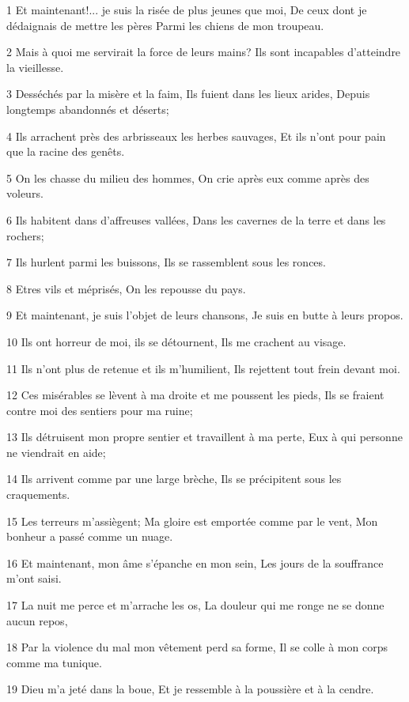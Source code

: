 \par 1 Et maintenant!... je suis la risée de plus jeunes que moi, De ceux dont je dédaignais de mettre les pères Parmi les chiens de mon troupeau.
\par 2 Mais à quoi me servirait la force de leurs mains? Ils sont incapables d'atteindre la vieillesse.
\par 3 Desséchés par la misère et la faim, Ils fuient dans les lieux arides, Depuis longtemps abandonnés et déserts;
\par 4 Ils arrachent près des arbrisseaux les herbes sauvages, Et ils n'ont pour pain que la racine des genêts.
\par 5 On les chasse du milieu des hommes, On crie après eux comme après des voleurs.
\par 6 Ils habitent dans d'affreuses vallées, Dans les cavernes de la terre et dans les rochers;
\par 7 Ils hurlent parmi les buissons, Ils se rassemblent sous les ronces.
\par 8 Etres vils et méprisés, On les repousse du pays.
\par 9 Et maintenant, je suis l'objet de leurs chansons, Je suis en butte à leurs propos.
\par 10 Ils ont horreur de moi, ils se détournent, Ils me crachent au visage.
\par 11 Ils n'ont plus de retenue et ils m'humilient, Ils rejettent tout frein devant moi.
\par 12 Ces misérables se lèvent à ma droite et me poussent les pieds, Ils se fraient contre moi des sentiers pour ma ruine;
\par 13 Ils détruisent mon propre sentier et travaillent à ma perte, Eux à qui personne ne viendrait en aide;
\par 14 Ils arrivent comme par une large brèche, Ils se précipitent sous les craquements.
\par 15 Les terreurs m'assiègent; Ma gloire est emportée comme par le vent, Mon bonheur a passé comme un nuage.
\par 16 Et maintenant, mon âme s'épanche en mon sein, Les jours de la souffrance m'ont saisi.
\par 17 La nuit me perce et m'arrache les os, La douleur qui me ronge ne se donne aucun repos,
\par 18 Par la violence du mal mon vêtement perd sa forme, Il se colle à mon corps comme ma tunique.
\par 19 Dieu m'a jeté dans la boue, Et je ressemble à la poussière et à la cendre.
